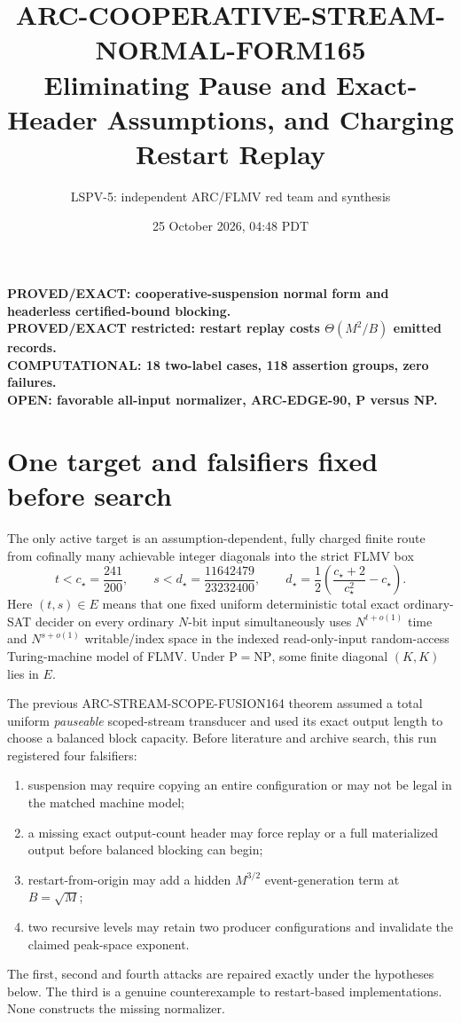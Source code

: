 \documentclass[11pt]{article}
\title{ARC-COOPERATIVE-STREAM-NORMAL-FORM165\\
\large Eliminating Pause and Exact-Header Assumptions, and Charging Restart Replay}
\author{LSPV-5: independent ARC/FLMV red team and synthesis}
\date{25 October 2026, 04:48 PDT}
\begin{document}
\maketitle
\begin{center}
\textbf{PROVED/EXACT: cooperative-suspension normal form and headerless certified-bound blocking.}\\
\textbf{PROVED/EXACT restricted: restart replay costs $\Theta(M^2/B)$ emitted records.}\\
\textbf{COMPUTATIONAL: 18 two-label cases, 118 assertion groups, zero failures.}\\
\textbf{OPEN: favorable all-input normalizer, ARC-EDGE-90, P versus NP.}
\end{center}

\section{One target and falsifiers fixed before search}
The only active target is an assumption-dependent, fully charged finite route
from cofinally many achievable integer diagonals into the strict FLMV box
\[
t<c_\star=\frac{241}{200},\qquad
s<d_\star=\frac{11642479}{23232400},\qquad
d_\star=\frac12\left(\frac{c_\star+2}{c_\star^2}-c_\star\right).
\]
Here $(t,s)\in E$ means that one fixed uniform deterministic total exact
ordinary-SAT decider on every ordinary $N$-bit input simultaneously uses
$N^{t+o(1)}$ time and $N^{s+o(1)}$ writable/index space in the indexed
read-only-input random-access Turing-machine model of FLMV.  Under
$\mathrm P=\mathrm{NP}$, some finite diagonal $(K,K)$ lies in $E$.

The previous ARC-STREAM-SCOPE-FUSION164 theorem assumed a total uniform
\emph{pauseable} scoped-stream transducer and used its exact output length to
choose a balanced block capacity.  Before literature and archive search, this
run registered four falsifiers:
\begin{enumerate}
\item suspension may require copying an entire configuration or may not be
legal in the matched machine model;
\item a missing exact output-count header may force replay or a full materialized
output before balanced blocking can begin;
\item restart-from-origin may add a hidden $M^{3/2}$ event-generation term at
$B=\sqrt M$;
\item two recursive levels may retain two producer configurations and invalidate
the claimed peak-space exponent.
\end{enumerate}
The first, second and fourth attacks are repaired exactly under the hypotheses
below.  The third is a genuine counterexample to restart-based implementations.
None constructs the missing normalizer.
\end{document}
